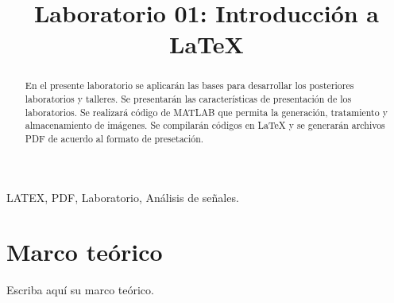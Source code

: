\documentclass[conference,compsoc,onecolumn]{IEEEtran}
\begin{document}
\title{\normalfont Laboratorio 01: Introducción a \LaTeX{}}
\author{
}


 \maketitle
\IEEEoverridecommandlockouts
\IEEEpeerreviewmaketitle
\begin{abstract}

\normalfont En el presente laboratorio se aplicarán las bases para desarrollar los posteriores laboratorios y talleres. Se presentarán las características de presentación de los laboratorios. Se realizará código de MATLAB que permita la generación, tratamiento y almacenamiento de imágenes. Se compilarán códigos en \LaTeX{} y se generarán archivos
PDF de acuerdo al formato de presetación.
\end{abstract}


\begin{IEEEkeywords}
  \normalfont  LATEX, PDF, Laboratorio, Análisis de señales.
\end{IEEEkeywords}


\section{\normalfont Marco teórico}
\label{sec:introduction}
Escriba aquí su marco teórico.
\end{document}
